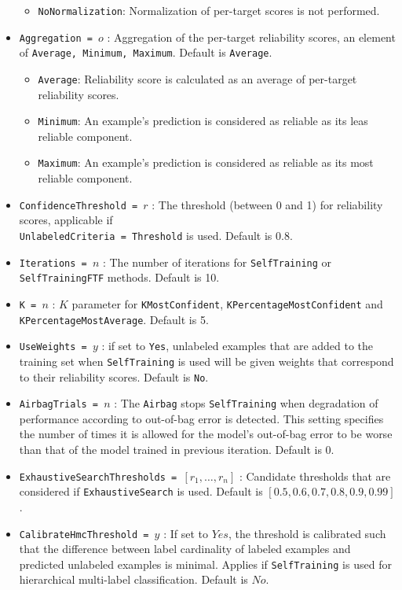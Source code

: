 \begin{itemize}
\begin{itemize}
		\item {\tt NoNormalization}: Normalization of per-target scores is not performed.
	\end{itemize}
	\item {\tt Aggregation = $o$} : Aggregation of the per-target reliability scores, an element of {\tt Average, Minimum, Maximum}. Default is {\tt Average}.
	\begin{itemize}
		\item {\tt Average}: Reliability score is calculated as an average of per-target reliability scores.
		\item {\tt Minimum}: An example's prediction is considered as reliable as its leas reliable component.
		\item {\tt Maximum}: An example's prediction is considered as reliable as its most reliable component.
	\end{itemize} 
	\item {\tt ConfidenceThreshold = $r$} : The threshold (between 0 and 1) for reliability scores, applicable if \\ {\tt UnlabeledCriteria = Threshold} is used. Default is 0.8.
	\item {\tt Iterations = $n$} : The number of iterations for {\tt SelfTraining} or {\tt SelfTrainingFTF} methods. Default is 10.
	\item {\tt K = $n$} : $K$ parameter for {\tt KMostConfident}, {\tt KPercentageMostConfident} and {\tt KPercentageMostAverage}. Default is 5.
	\item {\tt UseWeights = $y$} : if set to {\tt Yes}, unlabeled examples that are added to the training set when {\tt SelfTraining} is used will be given weights that correspond to their reliability scores. Default is {\tt No}.
	\item {\tt AirbagTrials = $n$} : The {\tt Airbag} stops {\tt SelfTraining} when degradation of performance according to out-of-bag error is detected. This setting specifies the number of times it is allowed for the model's out-of-bag error to be worse than that of the model trained in previous iteration. Default is 0. 
	\item {\tt ExhaustiveSearchThresholds =  $\left[ r_1, \ldots, r_n\right]$} : Candidate thresholds that are considered if {\tt ExhaustiveSearch} is used. Default is $\left[ 0.5,0.6,0.7,0.8,0.9,0.99\right]$.
	\item {\tt CalibrateHmcThreshold = $y$} : If set to $Yes$, the threshold is calibrated such that the difference between label cardinality of labeled examples and predicted unlabeled examples is minimal. Applies if {\tt SelfTraining} is used for hierarchical multi-label classification. Default is $No$.

\end{itemize}
